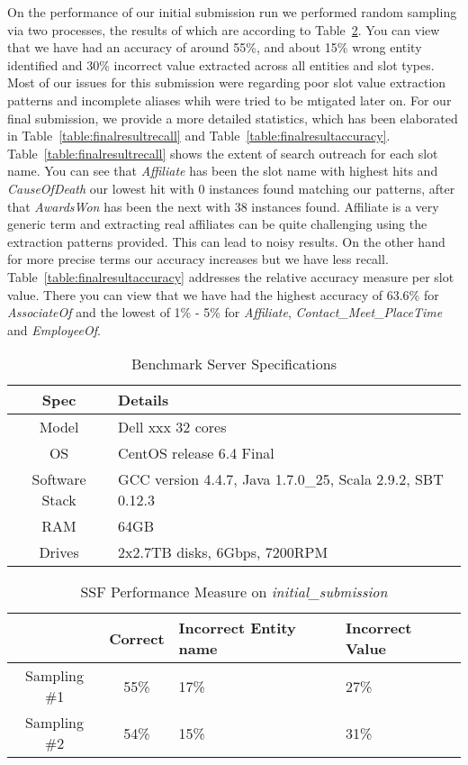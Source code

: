 On the performance of our initial submission run we performed random 
sampling via two processes, the results of which are according to
Table~\ref{table:initialresult}. You can view that we have had an accuracy of
around 55\%, and about 15\% wrong entity identified and 30\% incorrect value
extracted across all entities and slot types. Most of our issues for this submission were regarding poor slot value extraction patterns and incomplete aliases whih were tried to be mtigated later on. For our final submission, we
provide a more detailed statistics, which has been elaborated in
Table~\ref{table:finalresultrecall} and Table~\ref{table:finalresultaccuracy}.
Table~\ref{table:finalresultrecall} shows the extent of search outreach for
each slot name. You can see that \textit{Affiliate} has been the slot name with
highest hits and \textit{CauseOfDeath} our lowest hit with 0 instances found
matching our patterns, after that \textit{AwardsWon} has been the next with 38
instances found. Affiliate is a very generic term and extracting real affiliates can be quite challenging using the extraction patterns provided. This can lead to noisy results. On the other hand for more precise terms our accuracy increases but we have less recall. Table~\ref{table:finalresultaccuracy} addresses the relative
accuracy measure per slot value. There you can view that we have had the
highest accuracy of 63.6\% for \textit{AssociateOf} and the lowest of
1\% - 5\%  for \textit{Affiliate}, \textit{Contact\_Meet\_PlaceTime} and \textit{EmployeeOf}.

\begin{table}
\caption{Benchmark Server Specifications }
\centering
\label{table:serverspec}
\begin{tabular}{| c | p{5cm} |}
\hline 
\textbf{Spec} & \textbf{Details} \\ \hline
Model & Dell xxx 32 cores \\ \hline 
OS & CentOS release 6.4 Final \\ \hline 
Software Stack & GCC version 4.4.7, Java 1.7.0\_25, Scala 2.9.2, SBT 0.12.3 \\ \hline 
 RAM & 64GB\\ \hline 
 Drives & 2x2.7TB disks, 6Gbps, 7200RPM\\ \hline 
\end{tabular} 
\end{table}







\begin{table}
\caption{SSF Performance Measure on \textit{initial\_submission} }
\centering
\label{table:initialresult}

\begin{tabular}{ | c | c | p{2cm} | p{13mm} |}
\hline 
 & \textbf{Correct} & \textbf{Incorrect Entity name} & \textbf{Incorrect Value} \\ 
\hline 
Sampling \#1 & 55\% & 17\% & 27\% \\ 
\hline Sampling \#2 & 54\% & 15\% & 31\%  \\ 
\hline 
\end{tabular} 
\end{table}

